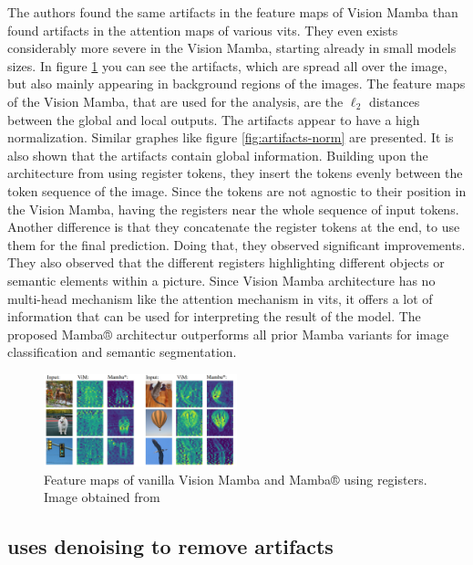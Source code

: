 \documentclass[conference]{IEEEtran}
\begin{document}
  The authors found the same artifacts in the feature maps of Vision Mamba than \citeauthor{registers} found artifacts in the attention maps of various \acp{vit}. They even exists considerably more severe in the Vision Mamba, starting already in small models sizes. In figure \ref{fig:mamba-artifacts} you can see the artifacts, which are spread all over the image, but also mainly appearing in background regions of the images. The feature maps of the Vision Mamba, that are used for the analysis, are the $\ell_2$ distances between the global and local outputs. The artifacts appear to have a high normalization. Similar graphes like figure \ref{fig:artifacts-norm} are presented. It is also shown that the artifacts contain global information. Building upon the architecture from \cite{registers} using register tokens, they insert the tokens evenly between the token sequence of the image. Since the tokens are not agnostic to their position in the Vision Mamba, having the registers near the whole sequence of input tokens. Another difference is that they concatenate the register tokens at the end, to use them for the final prediction. Doing that, they observed significant improvements. They also observed that the different registers highlighting different objects or semantic elements within a picture. Since Vision Mamba architecture has no multi-head mechanism like the attention mechanism in \acp{vit}, it offers a lot of information that can be used for interpreting the result of the model. The proposed Mamba® architectur outperforms all prior Mamba variants for image classification and semantic segmentation. \cite{mamba-needs-registers}

  \begin{figure}
    \centering
    \includegraphics[width=0.5\textwidth]{figures/mamba-artifacts.png}
    \caption{Feature maps of vanilla Vision Mamba \cite{vision-mamba} and Mamba® using registers. Image obtained from \cite{mamba-needs-registers}}
    \label{fig:mamba-artifacts}
  \end{figure}

  \subsection{\cite{denoising} uses denoising to remove artifacts}
  \label{sec:buildup:denoising}
\end{document}

